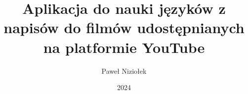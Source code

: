 \documentclass[thesis=inz]{TemplateCore/Dyplom}
\title{Aplikacja do nauki języków z napisów do filmów udostępnianych na platformie YouTube
}
\author{Paweł Niziołek}
\date{2024}
\begin{document}
\frontpages


\bibliografia


\clearpage
\clearpage
\listoffigures
\clearpage
\listoftables

\clearpage
\lstlistoflistings
\end{document}
